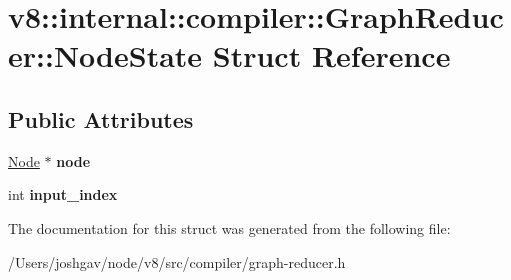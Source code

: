 \hypertarget{structv8_1_1internal_1_1compiler_1_1_graph_reducer_1_1_node_state}{}\section{v8\+:\+:internal\+:\+:compiler\+:\+:Graph\+Reducer\+:\+:Node\+State Struct Reference}
\label{structv8_1_1internal_1_1compiler_1_1_graph_reducer_1_1_node_state}
\subsection*{Public Attributes}
\begin{DoxyCompactItemize}
\item 
\hyperlink{classv8_1_1internal_1_1compiler_1_1_node}{Node} $\ast$ {\bfseries node}\hypertarget{structv8_1_1internal_1_1compiler_1_1_graph_reducer_1_1_node_state_ac26490960c35803d8bc7cab3f790d571}{}\label{structv8_1_1internal_1_1compiler_1_1_graph_reducer_1_1_node_state_ac26490960c35803d8bc7cab3f790d571}

\item 
int {\bfseries input\+\_\+index}\hypertarget{structv8_1_1internal_1_1compiler_1_1_graph_reducer_1_1_node_state_a09f3e1f14d0d7f3d0be0af452c42d9fa}{}\label{structv8_1_1internal_1_1compiler_1_1_graph_reducer_1_1_node_state_a09f3e1f14d0d7f3d0be0af452c42d9fa}

\end{DoxyCompactItemize}


The documentation for this struct was generated from the following file\+:\begin{DoxyCompactItemize}
\item 
/\+Users/joshgav/node/v8/src/compiler/graph-\/reducer.\+h\end{DoxyCompactItemize}

